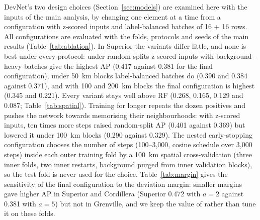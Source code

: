 \documentclass[pdflatex,sn-apa]{sn-jnl}
\begin{document}
\begin{appendices}
DevNet's two design choices (Section~\ref{sec:models}) are examined here with the inputs of the main analysis, by changing one element at a time from a configuration with z-scored inputs and label-balanced batches of 16 + 16 rows. All configurations are evaluated with the folds, protocols and seeds of the main results (Table~\ref{tab:ablation}). In Superior the variants differ little, and none is best under every protocol: under random splits z-scored inputs with background-heavy batches give the highest AP (0.417 against 0.381 for the final configuration), under 50~km blocks label-balanced batches do (0.390 and 0.384 against 0.371), and with 100 and 200~km blocks the final configuration is highest (0.345 and 0.221). Every variant stays well above RF (0.268, 0.165, 0.129 and 0.087; Table~\ref{tab:spatial}). Training for longer repeats the dozen positives and pushes the network towards memorising their neighbourhoods: with z-scored inputs, ten times more steps raised random-split AP (0.401 against 0.369) but lowered it under 100~km blocks (0.290 against 0.329). The nested early-stopping configuration chooses the number of steps (100--3,000, cosine schedule over 3,000 steps) inside each outer training fold by a 100~km spatial cross-validation (three inner folds, two inner restarts, background purged from inner validation blocks), so the test fold is never used for the choice. Table~\ref{tab:margin} gives the sensitivity of the final configuration to the deviation margin: smaller margins gave higher AP in Superior and Cordillera (Superior 0.472 with $a = 2$ against 0.381 with $a = 5$) but not in Grenville, and we keep the value of \citet{Pang2019} rather than tune it on these folds.


\end{appendices}
\end{document}
